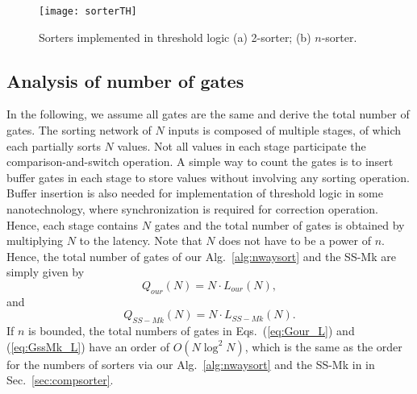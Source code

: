\documentclass[10pt,journal,cspaper,compsoc]{IEEEtran}
\begin{document}
\begin{figure}[!h]
\centering
\texttt{[image: sorterTH]}
\caption{Sorters implemented in threshold logic (a) 2-sorter; (b) $n$-sorter.}
\label{fig:sorterTH}
\end{figure}

\subsection{Analysis of number of gates}
In the following, we assume all gates are the same and derive the total number of gates. The sorting network of $N$ inputs is composed of multiple stages, of which each partially sorts $N$ values. Not all values in each stage participate the comparison-and-switch operation.
A simple way to count the gates is to insert buffer gates in each stage to store values without involving any sorting operation. Buffer insertion is also needed for implementation of threshold logic in some nanotechnology, where synchronization is required for correction operation.
Hence, each stage contains $N$ gates and the total number of gates is obtained by multiplying $N$ to the latency.
Note that $N$ does not have to be a power of $n$.
Hence, the total number of gates of our Alg.~\ref{alg:nwaysort} and the SS-Mk \cite{gao1997sloping} are simply given by
\begin{equation}
Q_{our}(N) = N \cdot L_{our}(N),
\label{eq:Gour_L}
\end{equation}
and
\begin{equation}
Q_{SS-Mk}(N) = N \cdot L_{SS-Mk}(N).
\label{eq:GssMk_L}
\end{equation}
If $n$ is bounded, the total numbers of gates in Eqs.~(\ref{eq:Gour_L}) and (\ref{eq:GssMk_L}) have an order of $O(N \log^2 N)$, which is the same as the order for the numbers of sorters via our Alg.~\ref{alg:nwaysort} and the SS-Mk in \cite{gao1997sloping} in Sec.~\ref{sec:compsorter}.
\end{document}
